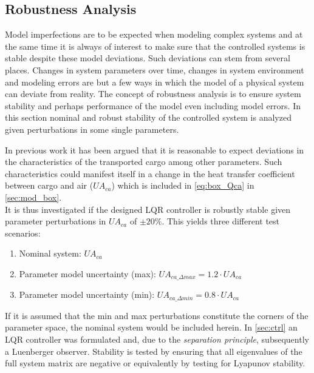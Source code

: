 \subsection{Robustness Analysis}\label{sec:robustness-analysis}

Model imperfections are to be expected when modeling complex systems and at the same time it is always of interest to make sure that the controlled systems is stable despite these model deviations. Such deviations can stem from several places. Changes in system parameters over time, changes in system environment and modeling errors are but a few ways in which the model of a physical system can deviate from reality. The concept of robustness analysis is to ensure system stability and perhaps performance of the model even including model errors. In this section nominal and robust stability of the controlled system is analyzed given perturbations in some single parameters.

In previous work \cite{Borlum2016} it has been argued that it is reasonable to expect deviations in the characteristics of the transported cargo among other parameters. Such characteristics could manifest itself in a change in the heat transfer coefficient between cargo and air ($U A_{ca}$) which is included in \cref{eq:box_Qca} in \cref{sec:mod_box}.\\

\noindent It is thus investigated if the designed LQR controller is robustly stable given parameter perturbations in $U A_{ca}$ of $\pm 20 \%$. This yields three different test scenarios:

\begin{enumerate}
	\item Nominal system: $U A_{ca}$
	\item Parameter model uncertainty (max): $U A_{ca\_\Delta max} = 1.2 \cdot U A_{ca}$
	\item Parameter model uncertainty (min): $U A_{ca\_\Delta min} = 0.8 \cdot U A_{ca}$
\end{enumerate}

\smallskip

\noindent If it is assumed that the min and max perturbations constitute the corners of the parameter space, the nominal system would be included herein. In \cref{sec:ctrl} an LQR controller was formulated and, due to the \textit{separation principle}, subsequently a Luenberger observer. Stability is tested by ensuring that all eigenvalues of the full system matrix are negative or equivalently by testing for Lyapunov stability.

